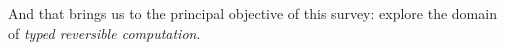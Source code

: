 \documentclass{article}
\newcommand{\jc}[1]{\fbox{Jacques says:} \textbf{#1}}
\begin{document}
And that brings us to the principal objective of this survey: explore the
domain of \emph{typed reversible computation}.



%
\end{document}
